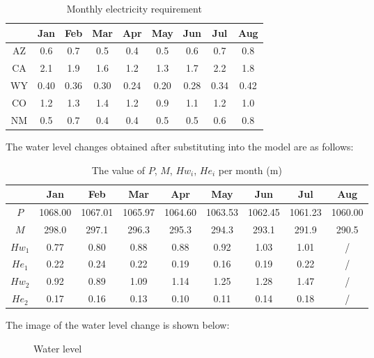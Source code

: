 \documentclass{mcmthesis}
\begin{document}
\begin{table}[h]
	\centering
	\caption{Monthly electricity requirement}
	\begin{tabular}{ccccccccc}
		\hline
		& Jan  & Feb  & Mar  & Apr  & May  & Jun  & Jul  & Aug  \\
		\hline
		AZ & 0.6  & 0.7  & 0.5  & 0.4  & 0.5  & 0.6  & 0.7  & 0.8  \\
		CA & 2.1  & 1.9  & 1.6  & 1.2  & 1.3  & 1.7  & 2.2  & 1.8  \\
		WY & 0.40 & 0.36 & 0.30 & 0.24 & 0.20 & 0.28 & 0.34 & 0.42 \\
		CO & 1.2  & 1.3  & 1.4  & 1.2  & 0.9  & 1.1  & 1.2  & 1.0  \\
		NM & 0.5  & 0.7  & 0.4  & 0.4  & 0.5  & 0.5  & 0.6  & 0.8 \\
		\hline
	\end{tabular}
\end{table}

The water level changes obtained after substituting into the model are as follows:
\begin{table}[h]
	\centering
	\caption{The value of $P$, $M$, $Hw_i$, $He_i$ per month (m)}
	\begin{tabular}{ccccccccc}
		\hline
		& Jan     & Feb     & Mar     & Apr     & May     & Jun     & Jul     & Aug     \\
		\hline
		$P$    & 1068.00 & 1067.01 & 1065.97 & 1064.60 & 1063.53 & 1062.45 & 1061.23 & 1060.00 \\
		$M$    & 298.0   & 297.1   & 296.3   & 295.3   & 294.3   & 293.1   & 291.9   & 290.5   \\
		$Hw_1$ & 0.77    & 0.80    & 0.88    & 0.88    & 0.92    & 1.03    & 1.01    &    /     \\
		$He_1$ & 0.22    & 0.24    & 0.22    & 0.19    & 0.16    & 0.19    & 0.22    &     /    \\
		$Hw_2$ & 0.92    & 0.89    & 1.09    & 1.14    & 1.25    & 1.28    & 1.47    &      /   \\
		$He_2$ & 0.17    & 0.16    & 0.13    & 0.10    & 0.11    & 0.14    & 0.18    &  
		/ \\
		\hline     
	\end{tabular}
\end{table}
\newpage
The image of the water level change is shown below:

\begin{figure}[h]
	\caption{Water level}
	\centering
\end{figure}
\end{document}

